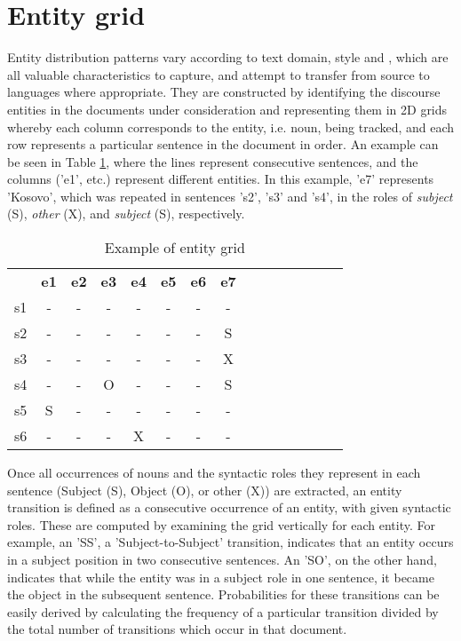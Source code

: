 \documentclass[output=paper]{langsci/langscibook.cls}
\begin{document}
\section{Entity grid}\label{entity_grid}
\largerpage
Entity distribution patterns vary according to text domain, style and , which are all valuable characteristics to capture, and attempt to transfer from source to  languages where appropriate. 
They are constructed by identifying the discourse entities in the documents under consideration and representing them in 2D grids whereby each column corresponds to the entity, i.e. noun, being tracked, and each row represents a particular sentence in the document in order. An example can be seen in Table \ref{grid-table}, where the lines represent consecutive sentences, and the columns ('e1', etc.) represent different entities. In this example, 'e7' represents 'Kosovo', which was repeated in sentences 's2', 's3' and 's4', in the roles of {\em subject} (S), {\em other} (X), and {\em subject} (S), respectively.

\begin{table}
\footnotesize

\begin{tabular}{|c|c|c|c|c|c|c|c|c|c|c|c|c|c|c|}
\hline \bf & \bf e1 & \bf e2 & \bf e3 & \bf e4 & \bf e5 & \bf e6 & \bf e7 \\  
s1&-&-&-&-&-&-&- \\
s2&-&-&-&-&-&-&S \\
s3&-&-&-&-&-&-&X \\
s4&-&-&O&-&-&-&S \\
s5&S&-&-&-&-&-&- \\
s6&-&-&-&X&-&-&- \\ \hline
\end{tabular}

\caption{\label{grid-table} Example of entity grid}
\end{table}


\newpage 
Once all occurrences of nouns and the syntactic roles they represent in each sentence (Subject (S), Object (O), or other (X)) are extracted, an {\sc entity transition} is defined as a consecutive occurrence of an entity, with given syntactic roles. These are computed by examining the grid vertically for each entity. For example, an 'SS', a 'Subject-to-Subject' transition, indicates that an entity occurs in a subject position in two consecutive sentences. An 'SO', on the other hand, indicates that while the entity was in a subject role in one sentence, it became the object in the subsequent sentence.
Probabilities for these transitions can be easily derived by calculating the frequency of a particular transition divided by the total number of transitions which occur in that document. 
\end{document}
